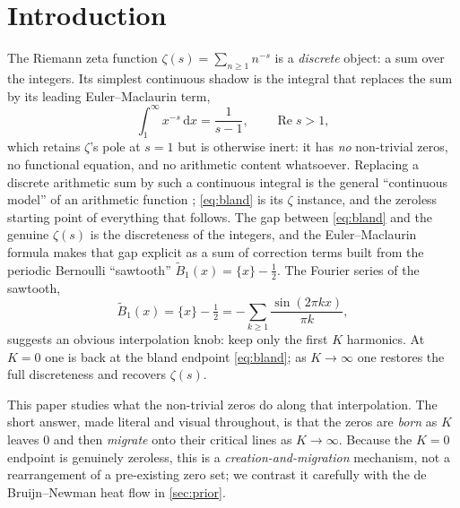 \documentclass[11pt]{article}
\theoremstyle{definition}
\renewcommand{\Re}{\operatorname{Re}}
\newcommand{\dd}{\mathrm{d}}
\begin{document}
\tableofcontents

\section{Introduction}\label{sec:intro}

The Riemann zeta function $\zeta(s) = \sum_{n\ge 1} n^{-s}$ is a \emph{discrete}
object: a sum over the integers. Its simplest continuous shadow is the integral
that replaces the sum by its leading Euler--Maclaurin term,
\begin{equation}\label{eq:bland}
  \int_1^\infty x^{-s}\,\dd x = \frac{1}{s-1}, \qquad \Re s > 1,
\end{equation}
which retains $\zeta$'s pole at $s=1$ but is otherwise inert: it has \emph{no}
non-trivial zeros, no functional equation, and no arithmetic content whatsoever.
Replacing a discrete arithmetic sum by such a continuous integral is the general
``continuous model'' of an arithmetic function \citep{Tao2017Continuous};
\eqref{eq:bland} is its $\zeta$ instance, and the zeroless starting point of
everything that follows.
The gap between \eqref{eq:bland} and the genuine $\zeta(s)$ is the
discreteness of the integers, and the Euler--Maclaurin formula makes that gap
explicit as a sum of correction terms built from the periodic Bernoulli
``sawtooth'' $\widetilde B_1(x) = \{x\}-\tfrac12$. The Fourier series of the
sawtooth,
\begin{equation}\label{eq:sawtooth}
  \widetilde B_1(x) = \{x\}-\tfrac12 = -\sum_{k\ge 1}\frac{\sin(2\pi k x)}{\pi k},
\end{equation}
suggests an obvious interpolation knob: keep only the first $K$ harmonics. At
$K=0$ one is back at the bland endpoint \eqref{eq:bland}; as $K\to\infty$ one
restores the full discreteness and recovers $\zeta(s)$.

This paper studies what the non-trivial zeros do along that interpolation. The
short answer, made literal and visual throughout, is that the zeros are
\emph{born} as $K$ leaves $0$ and then \emph{migrate} onto their critical lines as
$K\to\infty$. Because the $K=0$ endpoint is genuinely zeroless, this is a
\emph{creation-and-migration} mechanism, not a rearrangement of a pre-existing
zero set; we contrast it carefully with the de Bruijn--Newman heat flow in
\cref{sec:prior}.
\end{document}
